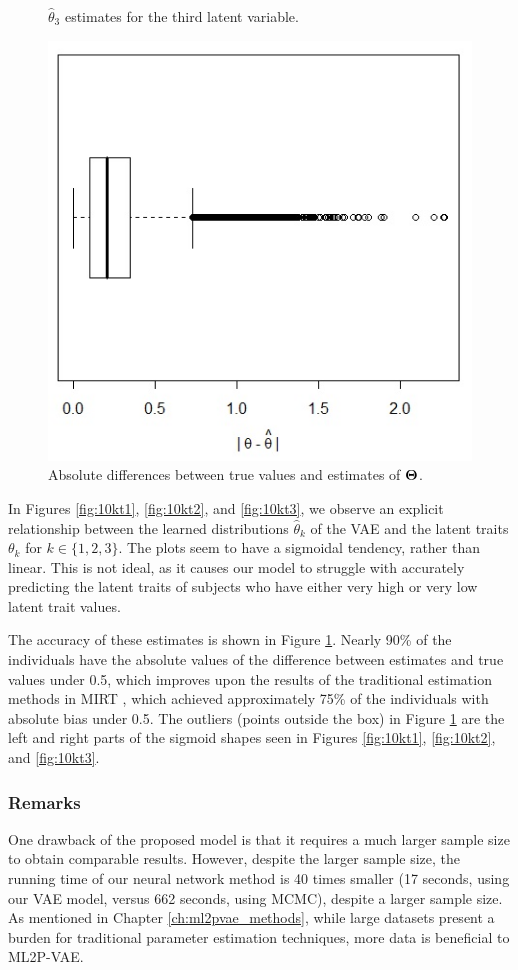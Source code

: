 \begin{figure}[h!]
\caption{$\hat{\theta}_3$ estimates for the third latent variable.}
\label{fig:10kt3}
\endminipage\hfill
{}
\includegraphics[height=0.7\textwidth,width=\columnwidth]{img/ijcnn_results/BxpTheta.jpg}
\caption{Absolute differences between true values and estimates of $\boldsymbol{\Theta}$.}
\label{fig:boxt10k}
\endminipage\hfill
\end{figure}

In Figures \ref{fig:10kt1}, \ref{fig:10kt2}, and \ref{fig:10kt3}, we observe an explicit relationship between the learned distributions $\hat{\theta}_k$ of the VAE and the latent traits $\theta_k$ for $k\in\{1,2,3\}$. The plots seem to have a sigmoidal tendency, rather than linear. This is not ideal, as it causes our model to struggle with accurately predicting the latent traits of subjects who have either very high or very low latent trait values. 

The accuracy of these estimates is shown in Figure \ref{fig:boxt10k}. Nearly 90\% of the individuals have the absolute values of the difference between estimates and true values under 0.5, which improves upon the results of the traditional estimation methods in MIRT \cite{daSilva2018}, which achieved approximately 75\% of the individuals with absolute bias under 0.5. The outliers (points outside the box) in Figure \ref{fig:boxt10k} are the left and right parts of the sigmoid shapes seen in Figures \ref{fig:10kt1}, \ref{fig:10kt2}, and \ref{fig:10kt3}.

\subsubsection{Remarks}
One drawback of the proposed model is that it requires a much larger sample size to obtain comparable results. However, despite the larger sample size, the running time of our neural network method is 40 times smaller (17 seconds, using our VAE model, versus 662 seconds, using MCMC), despite a larger sample size. As mentioned in Chapter \ref{ch:ml2pvae_methods}, while large datasets present a burden for traditional parameter estimation techniques, more data is beneficial to ML2P-VAE.

